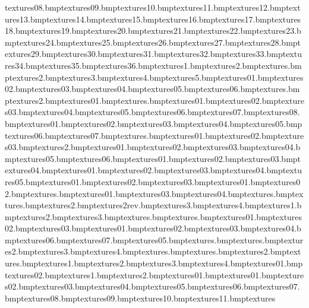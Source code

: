  textures\sign08.bmp textures\sign09.bmp textures\sign10.bmp textures\sign11.bmp textures\sign12.bmp textures\sign13.bmp textures\sign14.bmp textures\sign15.bmp textures\sign16.bmp textures\sign17.bmp textures\sign18.bmp textures\sign19.bmp textures\sign20.bmp textures\sign21.bmp textures\sign22.bmp textures\sign23.bmp textures\sign24.bmp textures\sign25.bmp textures\sign26.bmp textures\sign27.bmp textures\sign28.bmp textures\sign29.bmp textures\sign30.bmp textures\sign31.bmp textures\sign32.bmp textures\sign33.bmp textures\sign34.bmp textures\sign35.bmp textures\sign36.bmp textures\simplewall1.bmp textures\simplewall2.bmp textures\simplewallextra.bmp textures\simplewallextra2.bmp textures\simplewallextra3.bmp textures\simplewallextra4.bmp textures\simplewallextra5.bmp textures\slide01.bmp textures\slide02.bmp textures\slide03.bmp textures\slide04.bmp textures\slide05.bmp textures\slide06.bmp textures\snow.bmp textures\snow2.bmp textures\snowbarber01.bmp textures\snowblanket.bmp textures\snowdecal01.bmp textures\snowdecal02.bmp textures\snowdecal03.bmp textures\snowdecal04.bmp textures\snowdecal05.bmp textures\snowdecal06.bmp textures\snowdecal07.bmp textures\snowdecal08.bmp textures\snowplank01.bmp textures\snowplank02.bmp textures\snowplank03.bmp textures\snowplank04.bmp textures\snowplank05.bmp textures\snowplank06.bmp textures\snowplank07.bmp textures\snowpole.bmp textures\snowpole01.bmp textures\snowpole02.bmp textures\snowpole03.bmp textures\snowpole2.bmp textures\snowtograss01.bmp textures\snowtograss02.bmp textures\snowtograss03.bmp textures\snowtograss04.bmp textures\snowtograss05.bmp textures\snowtograss06.bmp textures\snowtograsscorner01.bmp textures\snowtograsscorner02.bmp textures\snowtograsscorner03.bmp textures\snowtograsscorner04.bmp textures\snowtopath01.bmp textures\snowtopath02.bmp textures\snowtopath03.bmp textures\snowtopath04.bmp textures\snowtopath05.bmp textures\snowtopathcorner01.bmp textures\snowtopathcorner02.bmp textures\snowtopathcorner03.bmp textures\snowtopathdecal01.bmp textures\snowtopathdecal02.bmp textures\snowtree.bmp textures\snowtree01.bmp textures\snowtree03.bmp textures\snowtree04.bmp textures\strawfloor.bmp textures\tazsign.bmp textures\tazsign2.bmp textures\tazsign2rev.bmp textures\tazsign3.bmp textures\tazsign4.bmp textures\templevines1.bmp textures\templevines2.bmp textures\templevines3.bmp textures\test.bmp textures\torch.bmp textures\torpedo01.bmp textures\torpedo02.bmp textures\torpedo03.bmp textures\trash01.bmp textures\trash02.bmp textures\trash03.bmp textures\trash04.bmp textures\trash06.bmp textures\trash07.bmp textures\trashcan05.bmp textures\treeend.bmp textures\treeleave.bmp textures\treeleave2.bmp textures\treeleave3.bmp textures\treeleave4.bmp textures\treeplanks.bmp textures\treeropes.bmp textures\treeropes2.bmp textures\treeropesend.bmp textures\treewall1.bmp textures\treewall2.bmp textures\treewall3.bmp textures\treewall4.bmp textures\vines01.bmp textures\vines02.bmp textures\wardensign1.bmp textures\wardensign2.bmp textures\water01.bmp textures\waterfall01.bmp textures\waterfall02.bmp textures\waterfall03.bmp textures\waterfall04.bmp textures\waterfall05.bmp textures\waterfall06.bmp textures\waterfall07.bmp textures\waterfall08.bmp textures\waterfall09.bmp textures\waterfall10.bmp textures\waterfall11.bmp textures\wa
